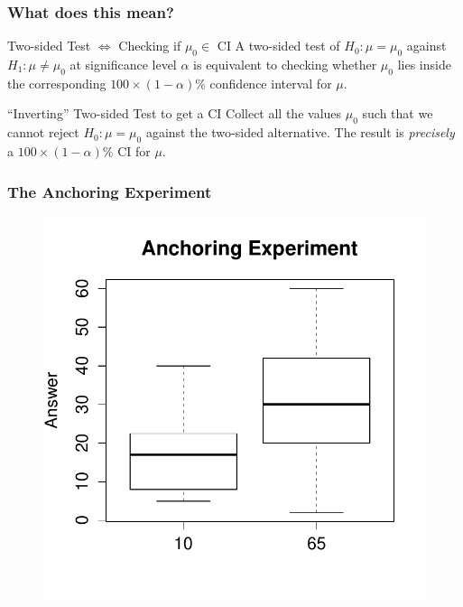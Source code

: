 \documentclass[handout]{beamer}
\begin{document}
\begin{frame}
\frametitle{What does this mean?}

\begin{block}
	{Two-sided Test $\iff$ Checking if $\mu_0 \in$ CI}
	A two-sided test of $H_0\colon \mu = \mu_0$ against $H_1\colon \mu\neq \mu_0 $ at significance level $\alpha$ is equivalent to checking whether $\mu_0$ lies inside the corresponding $100\times (1-\alpha)\%$ confidence interval for $\mu$.
\end{block}

\pause

\begin{block}
	{``Inverting'' Two-sided Test to get a CI}	
	Collect all the values $\mu_0$ such that we cannot reject $H_0\colon \mu = \mu_0$ against the two-sided alternative. The result is \emph{precisely} a $100\times (1-\alpha)\%$ CI for $\mu$.
\end{block}
\end{frame}
\begin{frame}
\frametitle{The Anchoring Experiment}
\begin{figure}
\centering
\includegraphics[scale = 0.55]{./images/anchoring_boxplot}
\end{figure}
\end{frame}
\end{document}
